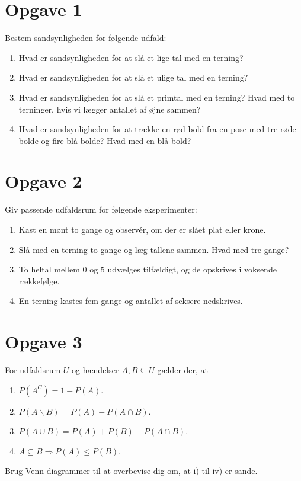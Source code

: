 \section*{Opgave 1}
Bestem sandsynligheden for følgende udfald:
\begin{enumerate}[label=\roman*)]
\item Hvad er sandsynligheden for at slå et lige tal med en terning?
\item Hvad er sandsynligheden for at slå et ulige tal med en terning?
\item Hvad er sandsynligheden for at slå et primtal med en terning? Hvad med to terninger, hvis vi lægger antallet af øjne sammen?
\item Hvad er sandsynligheden for at trække en rød bold fra en pose med tre røde bolde og fire blå bolde? Hvad med en blå bold?

\end{enumerate}
\section*{Opgave 2}
Giv passende udfaldsrum for følgende eksperimenter:
\begin{enumerate}[label=\roman*)]
\item Kast en mønt to gange og observér, om der er slået plat eller krone. 
\item Slå med en terning to gange og læg tallene sammen. Hvad med tre gange?
\item To heltal mellem $0$ og $5$ udvælges tilfældigt, og de opskrives i voksende rækkefølge.
\item En terning kastes fem gange og antallet af seksere nedskrives.
\end{enumerate}
\section*{Opgave 3}
For udfaldsrum $U$ og hændelser $A,B\subseteq U$ gælder der, at 
\begin{enumerate}[label=\roman*)]
\item $P(A^C) = 1-P(A)$.
\item $P(A \backslash B) = P(A) - P(A\cap B)$.
\item $P(A\cup B) = P(A)+P(B)-P(A\cap B)$.
\item $A\subseteq B \Rightarrow P(A)\leq P(B).$ 
\end{enumerate}
Brug Venn-diagrammer til at overbevise dig om, at i) til iv) er sande.


